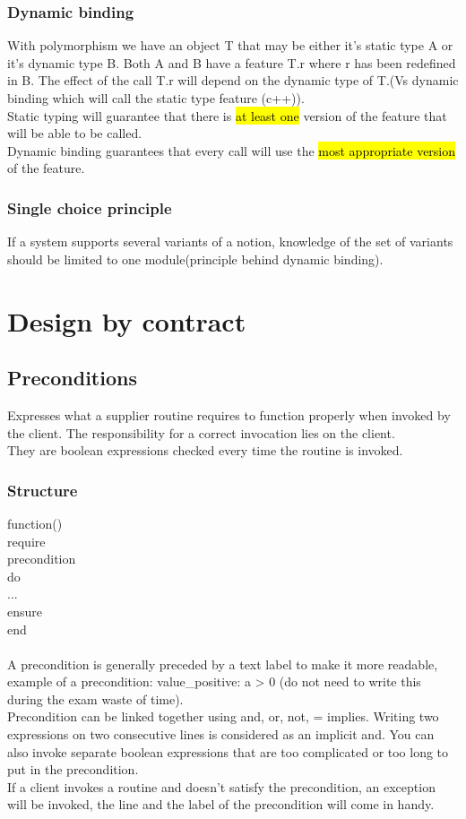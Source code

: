 \documentclass[11pt]{article}
\newcommand\tab[1][1cm]{\hspace*{#1}}
\begin{document}
\subsubsection{Dynamic binding}
With polymorphism we have an object T that may be either it's static type A or it's dynamic type B. Both A and B have a feature T.r where r has been redefined in B. The effect of the call T.r will depend on the dynamic type of T.(Vs dynamic binding which will call the static type feature (c++)).\\Static typing will guarantee that there is \hl{at least one} version of the feature that will be able to be called.\\Dynamic binding guarantees that every call will use the \hl{most appropriate version} of the feature.
\subsubsection{Single choice principle}
If a system supports several variants of a notion, knowledge of the set of variants should be limited to one module(principle behind dynamic binding).
\section{Design by contract}
\subsection{Preconditions}
Expresses what a supplier routine requires to function properly when invoked by the client. The responsibility for a correct invocation lies on the client.\\They are boolean expressions checked every time the routine is invoked.
\subsubsection{Structure}
function()\\\tab require\\\tab\tab precondition\\\tab do\\\tab\tab ...\\\tab ensure\\\tab end\\\\A precondition is generally preceded by a text label to make it more readable, example of a precondition: value\_positive: a > 0 (do not need to write this during the exam waste of time).\\Precondition can be linked together using and, or, not, = implies. Writing two expressions on two consecutive lines is considered as an implicit and. You can also invoke separate boolean expressions that are too complicated or too long to put in the precondition.\\If a client invokes a routine and doesn't satisfy the precondition, an exception will be invoked, the line and the label of the precondition will come in handy.
\end{document}
